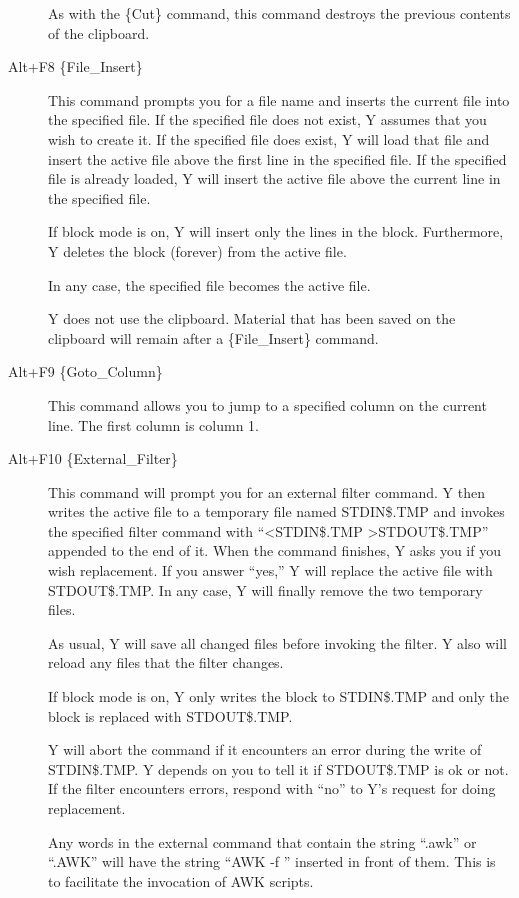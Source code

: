 \begin{description}
  As with the \{Cut\} command, this command destroys the previous contents of the clipboard.

\item[Alt+F8 \{File\_Insert\}] This command prompts you for a file name and inserts the current
  file into the specified file. If the specified file does not exist, Y assumes that you wish to
  create it. If the specified file does exist, Y will load that file and insert the active file
  above the first line in the specified file. If the specified file is already loaded, Y will
  insert the active file above the current line in the specified file.

  If block mode is on, Y will insert only the lines in the block. Furthermore, Y deletes the
  block (forever) from the active file.

  In any case, the specified file becomes the active file.

  Y does not use the clipboard. Material that has been saved on the clipboard will remain after
  a \{File\_Insert\} command.

\item[Alt+F9 \{Goto\_Column\}] This command allows you to jump to a specified column on the
  current line. The first column is column 1.

\item[Alt+F10 \{External\_Filter\}] This command will prompt you for an external filter command.
  Y then writes the active file to a temporary file named STDIN\$.TMP and invokes the specified
  filter command with ``<STDIN\$.TMP >STDOUT\$.TMP'' appended to the end of it. When the command
  finishes, Y asks you if you wish replacement. If you answer ``yes,'' Y will replace the active
  file with STDOUT\$.TMP. In any case, Y will finally remove the two temporary files.

  As usual, Y will save all changed files before invoking the filter. Y also will reload any
  files that the filter changes.

  If block mode is on, Y only writes the block to STDIN\$.TMP and only the block is replaced
  with STDOUT\$.TMP.

  Y will abort the command if it encounters an error during the write of STDIN\$.TMP. Y depends
  on you to tell it if STDOUT\$.TMP is ok or not. If the filter encounters errors, respond with
  ``no'' to Y's request for doing replacement.

  Any words in the external command that contain the string ``.awk'' or ``.AWK'' will have the
  string ``AWK -f '' inserted in front of them. This is to facilitate the invocation of AWK
  scripts.

\end{description}

